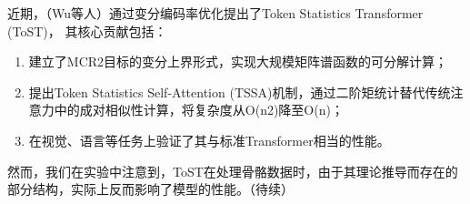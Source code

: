 近期，（Wu等人）通过变分编码率优化提出了Token Statistics Transformer (ToST)\cite{tost}，
其核心贡献包括：
\begin{enumerate}
    \item 建立了MCR2目标的变分上界形式，实现大规模矩阵谱函数的可分解计算；
    \item 提出Token Statistics Self-Attention (TSSA)机制，通过二阶矩统计替代传统注意力中的成对相似性计算，将复杂度从O(n2)降至O(n)；
    \item 在视觉、语言等任务上验证了其与标准Transformer相当的性能。
\end{enumerate}

然而，我们在实验中注意到，ToST在处理骨骼数据时，由于其理论推导而存在的部分结构，实际上反而影响了模型的性能。（待续）